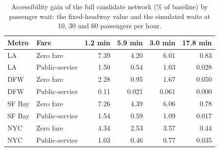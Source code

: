 \begin{table}[!htbp]
\centering
\caption{Accessibility gain of the full candidate network (\% of baseline) by passenger wait: the fixed-headway value and the simulated waits at 10, 30 and 60 passengers per hour.}
\label{tab:wait}
\small
\begin{tabular}{llrrrr}
\toprule
Metro & Fare & 1.2 min & 5.9 min & 3.0 min & 17.8 min \\
\midrule
LA & Zero fare & 7.39 & 4.20 & 6.01 & 0.83 \\
LA & Public-service & 1.50 & 0.54 & 1.03 & 0.028 \\
DFW & Zero fare & 2.28 & 0.95 & 1.67 & 0.050 \\
DFW & Public-service & 0.11 & 0.021 & 0.061 & 0.000 \\
SF Bay & Zero fare & 7.26 & 4.39 & 6.06 & 0.78 \\
SF Bay & Public-service & 1.54 & 0.59 & 1.09 & 0.017 \\
NYC & Zero fare & 4.34 & 2.53 & 3.57 & 0.44 \\
NYC & Public-service & 1.03 & 0.46 & 0.77 & 0.035 \\
\bottomrule
\end{tabular}
\end{table}

